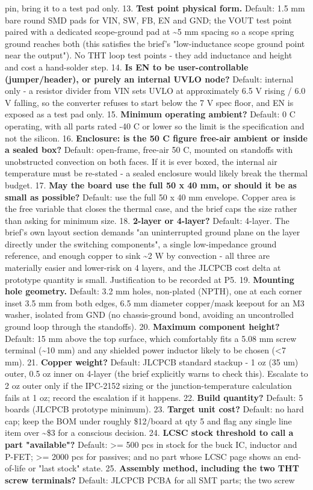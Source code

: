 \documentclass[11pt,a4paper]{article}
\begin{document}
pin, bring it to a test pad only. 13. \textbf{Test point physical form.} Default: 1.5 mm bare round SMD pads for VIN, SW, FB, EN and GND; the VOUT test point paired with a dedicated scope-ground pad at \textasciitilde{}5 mm spacing so a scope spring ground reaches both (this satisfies the brief's "low-inductance scope ground point near the output"). No THT loop test points - they add inductance and height and cost a hand-solder step. 14. \textbf{Is EN to be user-controllable (jumper/header), or purely an internal UVLO node?} Default: internal only - a resistor divider from VIN sets UVLO at approximately 6.5 V rising / 6.0 V falling, so the converter refuses to start below the 7 V spec floor, and EN is exposed as a test pad only. 15. \textbf{Minimum operating ambient?} Default: 0 C operating, with all parts rated -40 C or lower so the limit is the specification and not the silicon. 16. \textbf{Enclosure: is the 50 C figure free-air ambient or inside a sealed box?} Default: open-frame, free-air 50 C, mounted on standoffs with unobstructed convection on both faces. If it is ever boxed, the internal air temperature must be re-stated - a sealed enclosure would likely break the thermal budget. 17. \textbf{May the board use the full 50 x 40 mm, or should it be as small as possible?} Default: use the full 50 x 40 mm envelope. Copper area is the free variable that closes the thermal case, and the brief caps the size rather than asking for minimum size. 18. \textbf{2-layer or 4-layer?} Default: 4-layer. The brief's own layout section demands "an uninterrupted ground plane on the layer directly under the switching components", a single low-impedance ground reference, and enough copper to sink \textasciitilde{}2 W by convection - all three are materially easier and lower-risk on 4 layers, and the JLCPCB cost delta at prototype quantity is small. Justification to be recorded at P5. 19. \textbf{Mounting hole geometry.} Default: 3.2 mm holes, non-plated (NPTH), one at each corner inset 3.5 mm from both edges, 6.5 mm diameter copper/mask keepout for an M3 washer, isolated from GND (no chassis-ground bond, avoiding an uncontrolled ground loop through the standoffs). 20. \textbf{Maximum component height?} Default: 15 mm above the top surface, which comfortably fits a 5.08 mm screw terminal (\textasciitilde{}10 mm) and any shielded power inductor likely to be chosen (\textless{}7 mm). 21. \textbf{Copper weight?} Default: JLCPCB standard stackup - 1 oz (35 um) outer, 0.5 oz inner on 4-layer (the brief explicitly warns to check this). Escalate to 2 oz outer only if the IPC-2152 sizing or the junction-temperature calculation fails at 1 oz; record the escalation if it happens. 22. \textbf{Build quantity?} Default: 5 boards (JLCPCB prototype minimum). 23. \textbf{Target unit cost?} Default: no hard cap; keep the BOM under roughly \$12/board at qty 5 and flag any single line item over \textasciitilde{}\$3 for a conscious decision. 24. \textbf{LCSC stock threshold to call a part "available"?} Default: \textgreater{}= 500 pcs in stock for the buck IC, inductor and P-FET; \textgreater{}= 2000 pcs for passives; and no part whose LCSC page shows an end-of-life or "last stock" state. 25. \textbf{Assembly method, including the two THT screw terminals?} Default: JLCPCB PCBA for all SMT parts; the two screw 
\end{document}
